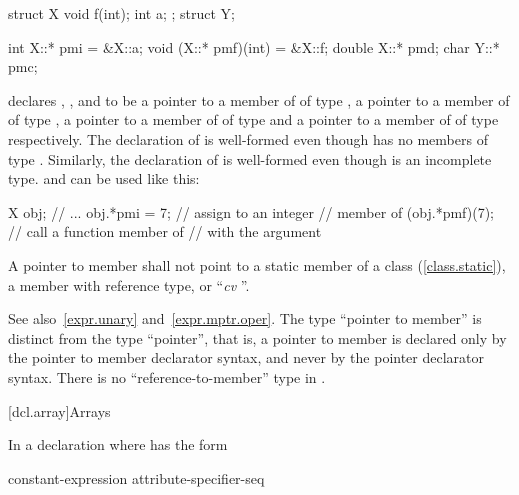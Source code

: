 \pnum
\begin{example}%

\begin{codeblock}
struct X {
  void f(int);
  int a;
};
struct Y;

int X::* pmi = &X::a;
void (X::* pmf)(int) = &X::f;
double X::* pmd;
char Y::* pmc;
\end{codeblock}

declares
,
,
and
to be a pointer to a member of
of type
,
a pointer to a member of
of type
,
a pointer to a member of
of type
and a pointer to a member of
of type
respectively.
The declaration of
is well-formed even though
has no members of type
.
Similarly, the declaration of
is well-formed even though
is an incomplete type.
and
can be used like this:

\begin{codeblock}
X obj;
// ...
obj.*pmi = 7;       // assign  to an integer
                    // member of 
(obj.*pmf)(7);      // call a function member of 
                    // with the argument 
\end{codeblock}
\end{example}

\pnum
A pointer to member shall not point to a static member
of a class (\ref{class.static}),
a member with reference type,
or
``\textit{cv}
''.

\begin{note}
See also~\ref{expr.unary} and~\ref{expr.mptr.oper}.
The type ``pointer to member'' is distinct from the type ``pointer'',
that is, a pointer to member is declared only by the pointer to member
declarator syntax, and never by the pointer declarator syntax.
There is no ``reference-to-member'' type in \Cpp.
\end{note}

[dcl.array]{Arrays}%

\pnum
In a declaration
where
has the form

\begin{ncsimplebnf}
\terminal{D1 [} constant-expression\opt{} \terminal{]} attribute-specifier-seq\opt
\end{ncsimplebnf}

